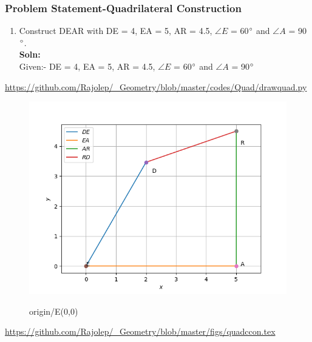 \begin{frame}
\frametitle{Problem Statement-Quadrilateral Construction}
\begin{enumerate}[label=(\roman*)]
\item Construct DEAR with DE = 4, EA = 5, AR = 4.5, $\angle {E}$ = 60$\degree$ and $\angle {A}$ = 90$\degree$.\\
\textbf{Soln:}\\
Given:-  DE = 4, EA = 5, AR = 4.5, $\angle {E}$ = 60$\degree$ and $\angle {A}$ = 90$\degree$\\
  \end{enumerate}
\url{https://github.com/Rajolep/_Geometry/blob/master/codes/Quad/drawquad.py}
\begin{figure}
\includegraphics[scale=0.4]{./figs/quadcon.png}
\end{figure}
\end{frame}
\begin{frame}
\begin{figure}
origin/E(0,0)

\end{figure}
\url{https://github.com/Rajolep/_Geometry/blob/master/figs/quadccon.tex}
\end{frame}
